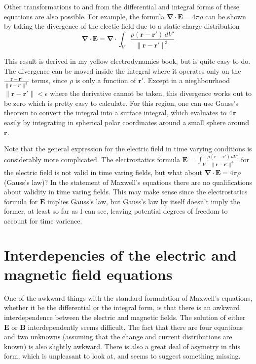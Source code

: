 \documentclass{article}      %
\newcommand{\norm}[1]{\lVert#1\rVert}
\newcommand{\grad}[0]{\boldsymbol{\nabla}}
\newcommand{\diverg}[0]{\grad \cdot}
\newcommand{\BB}[0]{\mathbf{B}}
\newcommand{\BE}[0]{\mathbf{E}}
\begin{document}
Other transformations to and from the differential and integral forms of these
equations are also possible.  For example, the formula $\diverg \BE = 4\pi\rho$ 
can be shown by taking the divergence of the electic field due to a static
charge distribution
\begin{equation*}
\diverg \BE = \diverg \int_V{\frac{\rho (\mathbf{r - r'})\,dV'}{\norm{\mathbf r - \mathbf r'}^3}}
\end{equation*}

This result is derived in my yellow electrodynamics book, but is quite easy to 
do.  The divergence can be moved inside the integral where it operates only on 
the $\frac {\mathbf{r - r'}} {\norm{\mathbf r - r'}^3}$ terms, since $\rho$ is 
only a function of $\mathbf r'$.  
Except in a nieghbourhood 
$\norm{\mathbf{r - r'}} < \epsilon$
where the derivative cannot be taken,
this divergence works out to be zero which is pretty easy to calculate.
For this region, one can use Gauss's theorem to convert the 
integral into a surface integral, which evaluates to $4\pi$ easily by integrating in spherical polar coordinates
around a small sphere around $\mathbf r$.

Note that the general expression for the 
electric field in time varying conditions is considerably more complicated.
The electrostatics formula 
$\BE = \int_V{\frac{\rho (\mathbf{r - r'})\,dV'}{\norm{\mathbf r - \mathbf r'}^3}}$
for the electric field is not valid in time 
varing fields, but what 
about $\diverg \BE = 4\pi\rho$ (Gauss's law)?  In the statement of Maxwell's equations
there are no qualifications about validity in time varing fields.  This may
make sense since the electrostatics formula for $\BE$ implies Gauss's law, 
but Gauss's law by itself doesn't imply the former, at least so far as I can
see, leaving potential 
degrees of freedom to account for time varience.

\section{Interdepencies of the electric and magnetic field equations}

One of the awkward things with the standard formulation of 
Maxwell's equations, whether it be the 
differential or the integral form, is that there 
is an awkward interdependence between the electric and magnetic fields. 
The solution of either $\BE$ or $\BB$ interdependently seems difficult.  The 
fact that there are four equations and two unknowns (assuming that the 
change and current distributions are known) is also slightly awkward.
There is also a great deal of asymetry in this form, which is unpleasant
to look at, and seems to suggest something missing.
\end{document}
